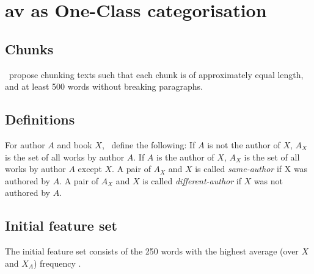 \section{\ac{av} as One-Class categorisation}
\label{sec:av_one_class}



\subsection{Chunks}
\citet{koppel_authorship_2004}\ propose chunking texts such that each chunk is of approximately equal length, 
and at least 500 words without breaking paragraphs. 

\subsection{Definitions}
For author $A$ and book $X$, \citet{koppel_authorship_2004}\ define the following:
If $A$ is not the author of $X$, $A_X$ is the set of all works by author $A$.
If $A$ is the author of $X$, $A_X$ is the set of all works by author $A$ except $X$.
A pair of $A_X$ and $X$ is called \emph{same-author} if X was authored by $A$.
A pair of $A_X$ and $X$ is called \emph{different-author} if $X$ was not authored by $A$.

\subsection{Initial feature set}
The initial feature set consists of the 250 words with the highest average (over $X$ and $X_A$) frequency \citep{koppel_authorship_2004}.

